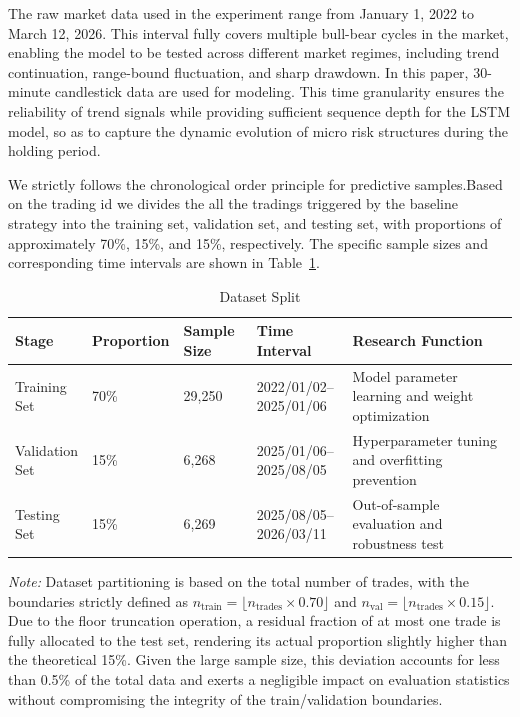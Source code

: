 \documentclass[12pt]{article}
\begin{document}
The raw market data used in the experiment range from January 1, 2022 to March 12, 2026. This interval fully covers multiple bull-bear cycles in the market, enabling the model to be tested across different market regimes, including trend continuation, range-bound fluctuation, and sharp drawdown. In this paper, 30-minute candlestick data are used for modeling. This time granularity ensures the reliability of trend signals while providing sufficient sequence depth for the LSTM model, so as to capture the dynamic evolution of micro risk structures during the holding period.

We strictly follows the chronological order principle for predictive samples.Based on the trading id we  divides the all the tradings triggered by the baseline strategy into the training set, validation set, and testing set, with proportions of approximately 70\%, 15\%, and 15\%, respectively. The specific sample sizes and corresponding time intervals are shown in Table~\ref{tab:dataset_split}.

\begin{table}[H]
\centering
\caption{Dataset Split}
\label{tab:dataset_split}
\small
\setlength{\tabcolsep}{4pt}
\renewcommand{\arraystretch}{1.2}
\begin{tabular}{p{}p{}p{}p{}p{}}
\toprule
Stage & Proportion & Sample Size & Time Interval & Research Function \\
\midrule
\makecell{Training\\Set} &
70\% &
29,250 &
\makecell{2022/01/02--\\2025/01/06} &
Model parameter learning and weight optimization \\

\makecell{Validation\\Set} &
15\% &
6,268 &
\makecell{2025/01/06--\\2025/08/05} &
Hyperparameter tuning and overfitting prevention \\

\makecell{Testing\\Set} &
15\% &
6,269 &
\makecell{2025/08/05--\\2026/03/11} &
Out-of-sample evaluation and robustness test \\
\bottomrule
\end{tabular}
    \vspace{6pt} 
    \parbox{\textwidth}{\footnotesize \textit{Note:} Dataset partitioning is based on the total number of trades, with the boundaries strictly defined as $n_{\text{train}} = \lfloor n_{\text{trades}} \times 0.70 \rfloor$ and $n_{\text{val}} = \lfloor n_{\text{trades}} \times 0.15 \rfloor$. Due to the floor truncation operation, a residual fraction of at most one trade is fully allocated to the test set, rendering its actual proportion slightly higher than the theoretical 15\%. Given the large sample size, this deviation accounts for less than 0.5\% of the total data and exerts a negligible impact on evaluation statistics without compromising the integrity of the train/validation boundaries.}
\end{table}
\end{document}
